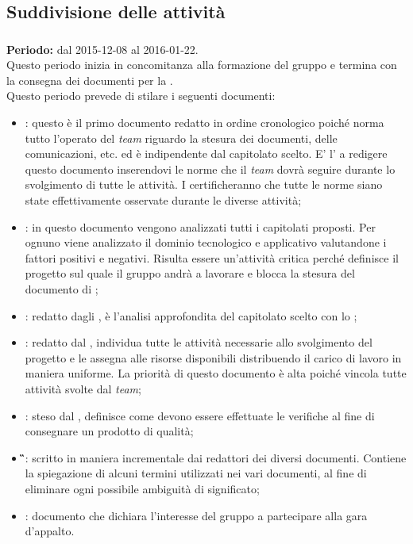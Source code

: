 \subsection{Suddivisione delle attività}

\subsubsection{\AR}
\textbf{Periodo:} dal 2015-12-08 al 2016-01-22.\\
Questo periodo inizia in concomitanza alla formazione del gruppo e termina con la consegna dei documenti per la \textit{\RR}.\\ 
Questo periodo prevede di stilare i seguenti documenti:
\begin{itemize}
		\item \textbf{\NdP}: questo è il primo documento redatto in ordine cronologico poiché norma tutto l'operato del \textit{team} riguardo la stesura dei documenti, delle comunicazioni, etc. ed è indipendente dal capitolato scelto. E' l’\textit{\Amm} a redigere questo documento inserendovi le norme che il \textit{team} dovrà seguire durante lo svolgimento di tutte le attività. I \textit{\Vers} certificheranno che tutte le norme siano state effettivamente osservate durante le diverse attività;
		\item \textbf{\SdF}: in questo documento vengono analizzati tutti i capitolati proposti. Per ognuno viene analizzato il dominio tecnologico e applicativo valutandone i fattori positivi e negativi. Risulta essere un'attività	critica perché definisce il progetto sul quale il gruppo andrà a lavorare e blocca la stesura del documento di \textit{\AdR};
		\item \textbf{\AdR}: redatto dagli \textit{\Anas}, è l'analisi approfondita del capitolato scelto con lo \textit{\SdF};
		\item \textbf{\PdP}: redatto dal \textit{\RdP}, individua tutte le attività necessarie allo svolgimento del progetto e le assegna alle risorse disponibili distribuendo il carico di lavoro in maniera uniforme.
		La priorità di questo documento è alta poiché vincola tutte attività svolte dal \textit{team};
		\item \textbf{\PdQ}: steso dal \textit{\Ver}, definisce come devono essere effettuate le verifiche al fine di consegnare un prodotto di qualità;
		\item \textbf{\G}: scritto in maniera incrementale dai redattori dei diversi documenti. Contiene la spiegazione di alcuni termini utilizzati nei vari documenti, al fine di eliminare ogni possibile ambiguità di significato;
		\item \textbf{\LdP}: documento che dichiara l’interesse del gruppo a partecipare alla gara d’appalto.
\end{itemize}
